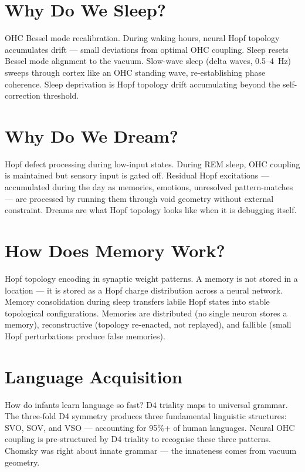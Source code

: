 \documentclass[aps,prl,twocolumn,superscriptaddress]{revtex4-2}
\begin{document}
\section{Why Do We Sleep?}

OHC Bessel mode recalibration. During waking hours, neural Hopf topology accumulates drift --- small deviations from optimal OHC coupling. Sleep resets Bessel mode alignment to the vacuum. Slow-wave sleep (delta waves, 0.5--4~Hz) sweeps through cortex like an OHC standing wave, re-establishing phase coherence. Sleep deprivation is Hopf topology drift accumulating beyond the self-correction threshold.

\section{Why Do We Dream?}

Hopf defect processing during low-input states. During REM sleep, OHC coupling is maintained but sensory input is gated off. Residual Hopf excitations --- accumulated during the day as memories, emotions, unresolved pattern-matches --- are processed by running them through void geometry without external constraint. Dreams are what Hopf topology looks like when it is debugging itself.

\section{How Does Memory Work?}

Hopf topology encoding in synaptic weight patterns. A memory is not stored in a location --- it is stored as a Hopf charge distribution across a neural network. Memory consolidation during sleep transfers labile Hopf states into stable topological configurations. Memories are distributed (no single neuron stores a memory), reconstructive (topology re-enacted, not replayed), and fallible (small Hopf perturbations produce false memories).

\section{Language Acquisition}

How do infants learn language so fast? D4 triality maps to universal grammar. The three-fold D4 symmetry produces three fundamental linguistic structures: SVO, SOV, and VSO --- accounting for 95\%+ of human languages. Neural OHC coupling is pre-structured by D4 triality to recognise these three patterns. Chomsky was right about innate grammar --- the innateness comes from vacuum geometry.
\end{document}
